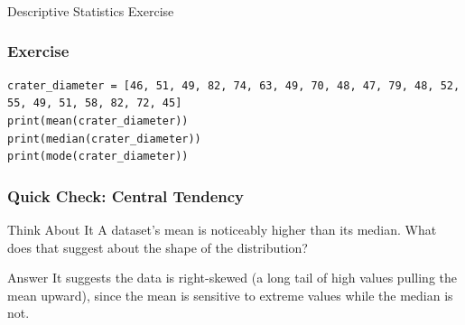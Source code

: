 



\begin{frame}[fragile]\frametitle{}
\begin{center}
{\Large Descriptive Statistics Exercise}
\end{center}
\end{frame}

\begin{frame}[fragile]\frametitle{Exercise}	
\begin{lstlisting}
crater_diameter = [46, 51, 49, 82, 74, 63, 49, 70, 48, 47, 79, 48, 52, 55, 49, 51, 58, 82, 72, 45]
print(mean(crater_diameter))
print(median(crater_diameter))
print(mode(crater_diameter))
\end{lstlisting}

\end{frame}

\begin{frame}[fragile]\frametitle{Quick Check: Central Tendency}
\begin{block}{Think About It}
A dataset's mean is noticeably higher than its median. What does that suggest about the shape of the distribution?
\end{block}
\pause
\begin{block}{Answer}
It suggests the data is right-skewed (a long tail of high values pulling the mean upward), since the mean is sensitive to extreme values while the median is not.
\end{block}
\end{frame}
